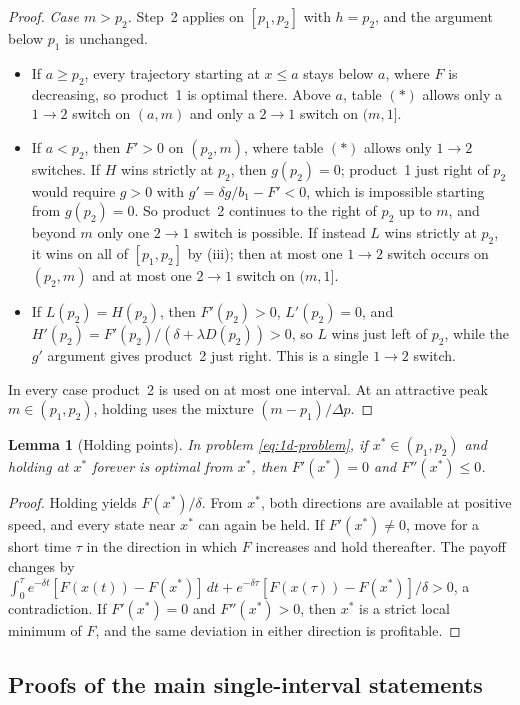 \documentclass[11pt]{article}
\newtheorem{lemma}{Lemma}
\theoremstyle{definition}
\begin{document}
\begin{proof}
\emph{Case $m>p_2$.} Step~2 applies on $[p_1,p_2]$ with $h=p_2$, and the
argument below $p_1$ is unchanged.
\begin{itemize}
\item If $a\geq p_2$, every trajectory starting at $x\leq a$ stays below
$a$, where $F$ is decreasing, so product~1 is optimal there. Above $a$,
table $(*)$ allows only a $1\to2$ switch on $(a,m)$ and only a $2\to1$
switch on $(m,1]$.
\item If $a<p_2$, then $F'>0$ on $(p_2,m)$, where table $(*)$ allows only
$1\to2$ switches. If $H$ wins strictly at $p_2$, then $g(p_2)=0$; product~1
just right of $p_2$ would require $g>0$ with $g'=\delta g/b_1-F'<0$, which
is impossible starting from $g(p_2)=0$. So product~2 continues to the right
of $p_2$ up to $m$, and beyond $m$ only one $2\to1$ switch is possible. If
instead $L$ wins strictly at $p_2$, it wins on all of $[p_1,p_2]$ by (iii);
then at most one $1\to2$ switch occurs on $(p_2,m)$ and at most one $2\to1$
switch on $(m,1]$.
\item If $L(p_2)=H(p_2)$, then $F'(p_2)>0$, $L'(p_2)=0$, and
$H'(p_2)=F'(p_2)/(\delta+\lambda D(p_2))>0$, so $L$ wins just left of $p_2$,
while the $g'$ argument gives product~2 just right. This is a single
$1\to2$ switch.
\end{itemize}
In every case product~2 is used on at most one interval. At an attractive
peak $m\in(p_1,p_2)$, holding uses the mixture $(m-p_1)/\Delta p$.
\end{proof}

\begin{lemma}[Holding points]\label{lem:holding}
In problem \eqref{eq:1d-problem}, if $x^*\in(p_1,p_2)$ and holding at $x^*$
forever is optimal from $x^*$, then $F'(x^*)=0$ and $F''(x^*)\leq0$.
\end{lemma}

\begin{proof}
Holding yields $F(x^*)/\delta$. From $x^*$, both directions are available at
positive speed, and every state near $x^*$ can again be held. If
$F'(x^*)\neq0$, move for a short time $\tau$ in the direction in which $F$
increases and hold thereafter. The payoff changes by
$\int_0^\tau e^{-\delta t}[F(x(t))-F(x^*)]\,dt
+e^{-\delta\tau}[F(x(\tau))-F(x^*)]/\delta>0$, a contradiction. If
$F'(x^*)=0$ and $F''(x^*)>0$, then $x^*$ is a strict local minimum of $F$,
and the same deviation in either direction is profitable.
\end{proof}

\subsection{Proofs of the main single-interval statements}
\end{document}
